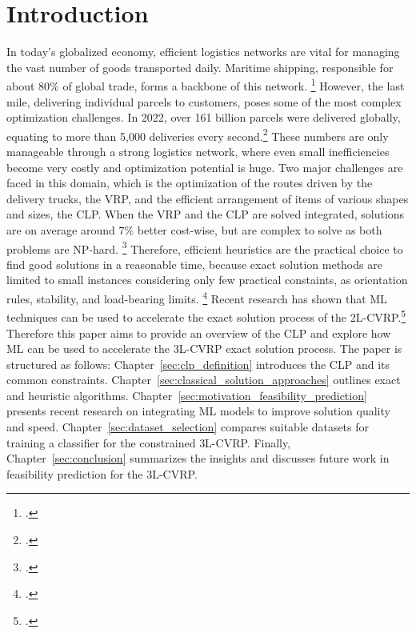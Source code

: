 \chapter{Introduction}
\label{sec:introduction}
In today’s globalized economy, efficient logistics networks are vital for managing the vast number of
goods transported daily. Maritime shipping, responsible for about $80\%$ of global trade,
forms a backbone of this network. \footcite[cf.][]{un_trade_and_development_unctad_review_2024}
However, the last mile, delivering individual parcels to customers, poses some of the most complex optimization
challenges. In 2022, over 161 billion parcels were delivered globally, equating to more than 5,000
deliveries every second.\footcite[cf.][]{statista_global_2022}
These numbers are only manageable through a strong logistics network, where even small inefficiencies
become very costly and optimization potential is huge. Two major challenges are faced in this domain, which
is the optimization of the routes driven by the delivery trucks, the \gls{VRP}, and the efficient arrangement of items
of various shapes and sizes, the \gls{CLP}. When the \gls{VRP} and the \gls{CLP} are solved integrated,
solutions are on average around $7\%$ better cost-wise, but are complex to solve as
both problems are NP-hard. \footcite[cf.][p. 23]{cote_value_2016} Therefore, efficient heuristics are the practical
choice to find good solutions in a reasonable time, because exact solution methods are limited to
small instances considering only few practical constaints, as orientation rules, stability, and load-bearing limits. \footcite[cf.][pp. 377--378]{bischoff_issues_1995}
Recent research has shown that \gls{ML} techniques can be used to accelerate the exact solution process of the \gls{2L-CVRP}.\footcite[cf.][]{zhang_learning-based_2022}
Therefore this paper aims to provide an overview
of the \gls{CLP} and explore how \gls{ML} can be used to accelerate the \gls{3L-CVRP} exact solution process.
The paper is structured as follows:
Chapter~\ref{sec:clp_definition} introduces the \gls{CLP} and its common constraints.
Chapter~\ref{sec:classical_solution_approaches} outlines exact and heuristic algorithms.
Chapter~\ref{sec:motivation_feasibility_prediction} presents recent research on integrating \gls{ML}
models to improve solution quality and speed. Chapter~\ref{sec:dataset_selection} compares suitable datasets
for training a classifier for the constrained \gls{3L-CVRP}. Finally, Chapter~\ref{sec:conclusion}
summarizes the insights and discusses future work in feasibility prediction for the \gls{3L-CVRP}.
